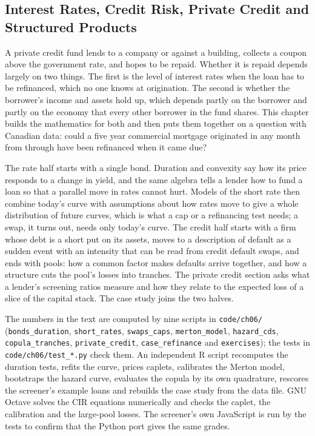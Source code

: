 
\begin{chapterrefs}
\setcounter{chapter}{5}
\chapter{Interest Rates, Credit Risk, Private Credit and Structured Products}
\label{ch:credit}

A private credit fund lends to a company or against a building, collects a coupon above the
government rate, and hopes to be repaid. Whether it is repaid depends largely on two things. The first is the level of
interest rates when the loan has to be refinanced, which no one knows at origination. The second is
whether the borrower's income and assets hold up, which depends partly on the borrower and partly on
the economy that every other borrower in the fund shares. This chapter builds the mathematics for
both and then puts them together on a question with Canadian data: could a five year commercial
mortgage originated in any month from \csFirst{} through \csLast{} have been refinanced when it came due?

The rate half starts with a single bond. Duration and convexity say how its price responds to a
change in yield, and the same algebra tells a lender how to fund a loan so that a parallel move in
rates cannot hurt. Models of the short rate then combine today's curve with assumptions about how rates move to give a
whole distribution of future curves, which is what a cap or a refinancing test needs; a swap, it turns out, needs only today's curve. The credit
half starts with a firm whose debt is a short put on its assets, moves to a description of default
as a sudden event with an intensity that can be read from credit default swaps, and ends with pools:
how a common factor makes defaults arrive together, and how a structure cuts the pool's losses into
tranches. The private credit section asks what a lender's screening ratios measure and how they
relate to the expected loss of a slice of the capital stack. The case study joins the two halves.

\begin{keybox}
The numbers in the text are computed by nine scripts in \texttt{code/ch06/}
(\texttt{bonds\_duration}, \texttt{short\_rates}, \texttt{swaps\_caps}, \texttt{merton\_model},
\texttt{hazard\_cds}, \texttt{copula\_tranches}, \texttt{private\_credit}, \texttt{case\_refinance} and
\texttt{exercises}); the tests in \texttt{code/ch06/test\_*.py} check them. An independent R script
recomputes the duration tests, refits the curve, prices caplets, calibrates the Merton model,
bootstraps the hazard curve, evaluates the copula by its own quadrature, rescores the screener's
example loans and rebuilds the case study from the data file. GNU Octave solves the CIR equations
numerically and checks the caplet, the calibration and the large-pool losses. The screener's own
JavaScript is run by the tests to confirm that the Python port gives the same grades.


\end{keybox}
\end{chapterrefs}
